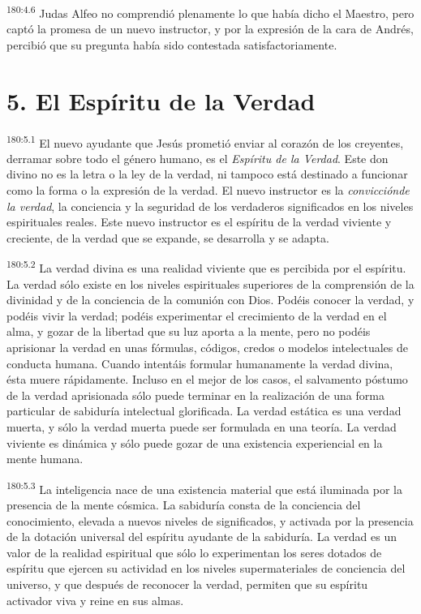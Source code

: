 \par
\textsuperscript{180:4.6} Judas Alfeo no comprendió plenamente lo que había dicho el Maestro, pero captó la promesa de un nuevo instructor, y por la expresión de la cara de Andrés, percibió que su pregunta había sido contestada satisfactoriamente.

\section*{5. El Espíritu de la Verdad}
\par
\textsuperscript{180:5.1} El nuevo ayudante que Jesús prometió enviar al corazón de los creyentes, derramar sobre todo el género humano, es el \textit{Espíritu de la Verdad}. Este don divino no es la letra o la ley de la verdad, ni tampoco está destinado a funcionar como la forma o la expresión de la verdad. El nuevo instructor es la \textit{convicciónde la verdad}, la conciencia y la seguridad de los verdaderos significados en los niveles espirituales reales. Este nuevo instructor es el espíritu de la verdad viviente y creciente, de la verdad que se expande, se desarrolla y se adapta.

\par
\textsuperscript{180:5.2} La verdad divina es una realidad viviente que es percibida por el espíritu. La verdad sólo existe en los niveles espirituales superiores de la comprensión de la divinidad y de la conciencia de la comunión con Dios. Podéis conocer la verdad, y podéis vivir la verdad; podéis experimentar el crecimiento de la verdad en el alma, y gozar de la libertad que su luz aporta a la mente, pero no podéis aprisionar la verdad en unas fórmulas, códigos, credos o modelos intelectuales de conducta humana. Cuando intentáis formular humanamente la verdad divina, ésta muere rápidamente. Incluso en el mejor de los casos, el salvamento póstumo de la verdad aprisionada sólo puede terminar en la realización de una forma particular de sabiduría intelectual glorificada. La verdad estática es una verdad muerta, y sólo la verdad muerta puede ser formulada en una teoría. La verdad viviente es dinámica y sólo puede gozar de una existencia experiencial en la mente humana.

\par
\textsuperscript{180:5.3} La inteligencia nace de una existencia material que está iluminada por la presencia de la mente cósmica. La sabiduría consta de la conciencia del conocimiento, elevada a nuevos niveles de significados, y activada por la presencia de la dotación universal del espíritu ayudante de la sabiduría. La verdad es un valor de la realidad espiritual que sólo lo experimentan los seres dotados de espíritu que ejercen su actividad en los niveles supermateriales de conciencia del universo, y que después de reconocer la verdad, permiten que su espíritu activador viva y reine en sus almas.

